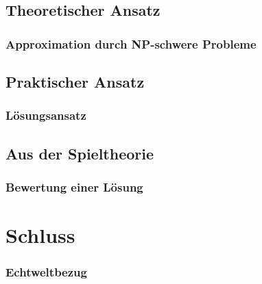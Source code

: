 \documentclass{beamer}
\begin{document}
	\subsection{Theoretischer Ansatz}	
		\begin{frame}
				\frametitle{Approximation durch NP-schwere Probleme}
		\end{frame}
	\subsection{Praktischer Ansatz}
		\begin{frame}
			\frametitle{Lösungsansatz}
		\end{frame}
	\subsection{Aus der Spieltheorie}
		\begin{frame}
			\frametitle{Bewertung einer Lösung}
		\end{frame}
\section{Schluss}
		\begin{frame}
			\frametitle{Echtweltbezug}
		\end{frame}
\end{document}
